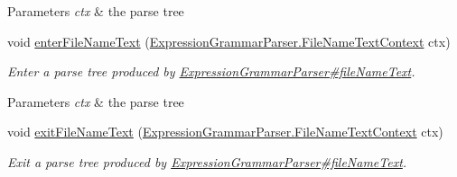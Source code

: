 \begin{DoxyCompactItemize}
\begin{DoxyCompactList}
\begin{DoxyParams}{Parameters}
{\em ctx} & the parse tree\\
\hline
\end{DoxyParams}
 \end{DoxyCompactList}\item 
void \hyperlink{classgov_1_1nasa_1_1jpf_1_1inspector_1_1server_1_1expression_1_1parser_1_1_expression_grammar_base_listener_a13849dd140d83cf5b5a7368f98d63eda}{enter\+File\+Name\+Text} (\hyperlink{classgov_1_1nasa_1_1jpf_1_1inspector_1_1server_1_1expression_1_1parser_1_1_expression_grammar_parser_1_1_file_name_text_context}{Expression\+Grammar\+Parser.\+File\+Name\+Text\+Context} ctx)
\begin{DoxyCompactList}\small\item\em Enter a parse tree produced by \hyperlink{classgov_1_1nasa_1_1jpf_1_1inspector_1_1server_1_1expression_1_1parser_1_1_expression_grammar_parser_a8cd683a15c48a56f1a8fbcaed2a4b049}{Expression\+Grammar\+Parser\#file\+Name\+Text}.


\begin{DoxyParams}{Parameters}
{\em ctx} & the parse tree\\
\hline
\end{DoxyParams}
 \end{DoxyCompactList}\item 
void \hyperlink{classgov_1_1nasa_1_1jpf_1_1inspector_1_1server_1_1expression_1_1parser_1_1_expression_grammar_base_listener_a0db45fbcc28c987a3bf3e763378a1755}{exit\+File\+Name\+Text} (\hyperlink{classgov_1_1nasa_1_1jpf_1_1inspector_1_1server_1_1expression_1_1parser_1_1_expression_grammar_parser_1_1_file_name_text_context}{Expression\+Grammar\+Parser.\+File\+Name\+Text\+Context} ctx)
\begin{DoxyCompactList}\small\item\em Exit a parse tree produced by \hyperlink{classgov_1_1nasa_1_1jpf_1_1inspector_1_1server_1_1expression_1_1parser_1_1_expression_grammar_parser_a8cd683a15c48a56f1a8fbcaed2a4b049}{Expression\+Grammar\+Parser\#file\+Name\+Text}.



\end{DoxyCompactList}
\end{DoxyCompactItemize}
